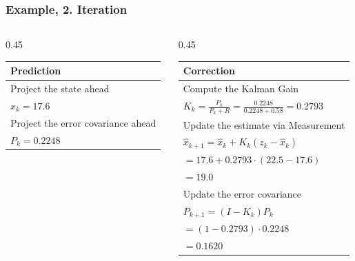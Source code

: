 \documentclass[aspectratio=169]{beamer}
\begin{document}
\begin{frame}
    \frametitle{Example, 2. Iteration}

    \begin{columns}[T]

        \begin{column}{0.45\textwidth}
            \begin{tabular}{ | l |  }
                \hline
                \bf{Prediction}                    \\
                \hline
                \hline
                Project the state ahead            \\
                \(\hat{x}_{k} = 17.6\)             \\
                \hline
                Project the error covariance ahead \\
                \(P_{k} = 0.2248\)                 \\
                \hline
            \end{tabular}
        \end{column}

        \begin{column}{0.45\textwidth}
            \begin{tabular}{ | l |  }
                \hline
                \bf{Correction}                                                         \\
                \hline
                \hline
                Compute the Kalman Gain                                                 \\
                \(K_{k} = \frac{P_{k}}{P_{k}+R} = \frac{0.2248}{0.2248+0.58} = 0.2793\) \\
                \hline
                Update the estimate via Measurement                                     \\
                \(\hat{x}_{k+1} = \hat{x}_{k} + K_{k}(z_{k} - \hat{x}_{k}) \)           \\
                \(= 17.6 + 0.2793 \cdot (22.5 - 17.6) \)                                \\
                \(= 19.0\)                                                              \\
                \hline
                Update the error covariance                                             \\
                \(P_{k+1} = (I - K_{k})P_{k}\)                                          \\
                \(=(1-0.2793)\cdot 0.2248\)                                             \\
                \(= 0.1620\)                                                            \\
                \hline
            \end{tabular}
        \end{column}
    \end{columns}

\end{frame}
\end{document}
